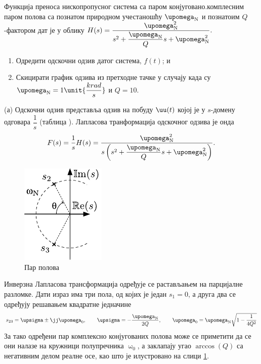 \PID \label{z:lpf_q}
\mnImportant
Функција преноса нископропусног система 
са паром конјуговано.комплесним паром полова са познатом природном учестаношћу $\upomega_{\rm N}$ 
и познатоим $Q$-фактором дат је у облику 
$H(s) = \dfrac{\upomega_{\rm N}^2 }{s^2 +  \dfrac{\upomega_{\rm N}}{Q}s + \upomega_{\rm N}^2}.$
\begin{enumerate}[label=(\alph*)]
    \item Одредити одскочни одзив датог система, $f(t)$; и 
    \item Скицирати график одзива из претходне тачке у случају када су $\upomega_{\rm N} = 1\unit{\dfrac{krad}{s}}$ и $Q = 10$. 
\end{enumerate}

\RESENJE 

(а) Одскочни одзив представља одзив на побуду $\uu(t)$ којој је у $s$-домену одговара 
$\dfrac{1}{s}$ (таблица ). Лапласова транформација одскочног одзива је онда 
\begin{equation}
    F(s) = \dfrac{1}{s} H(s) =
    \dfrac{\upomega_{\rm N}^2 }{ s\left( s^2 +  \dfrac{\upomega_{\rm N}}{Q}s + \upomega_{\rm N}^2 \right)}. \label{eq:\ID.F}
\end{equation}

\noindent
\begin{minipage}{\textwidth}
\begin{figure}
    \includegraphics{fig/Q_polovi.pdf}
    \caption{Пар полова}
    \label{fig:\ID.polovi}
\end{figure}
Инверзна Лапласова трансформација одређује се растављањем на парцијалне разломке. Дати израз има три пола, 
од којих је један
$s_1 = 0$, а друга два се одређују решавањем квадратне једначине 
\begin{equation}
    s_{23} = \upsigma \pm \jj\upomega_0, \qquad \upsigma = -\dfrac{\upomega_{\rm N}}{2Q}, \qquad \upomega_0 = \upomega_{\rm N} \sqrt{1 - \dfrac{1}{4Q^2}} 
\end{equation}
За тако одређени пар комплексно конјугованих полова може се приметити да се они налазе на кружници полупречника $\upomega_0$, а заклапају угао 
$\arccos(Q)$ са негативним делом реалне осе, као што је илустровано на слици \ref{fig:\ID.polovi}. 
\end{minipage} \\[5mm]
%

